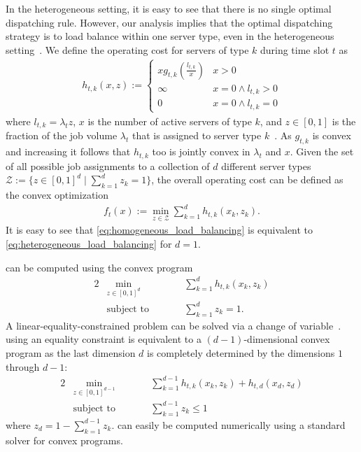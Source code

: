 In the heterogeneous setting, it is easy to see that there is no single optimal dispatching rule. However, our analysis implies that the optimal dispatching strategy is to load balance within one server type, even in the heterogeneous setting~\cite{Albers2021_2}. We define the operating cost for servers of type $k$ during time slot $t$ as \begin{align}\label{eq:heterogeneous_load_balancing_unit}
    h_{t,k}(x,z) := \begin{cases} 
        x g_{t,k}\left(\frac{l_{t,k}}{x}\right) & x > 0 \\
        \infty                                  & x = 0 \land l_{t,k} > 0 \\
        0                                       & x = 0 \land l_{t,k} = 0
    \end{cases}
\end{align} where $l_{t,k} = \lambda_t z$, $x$ is the number of active servers of type $k$, and $z \in [0,1]$ is the fraction of the job volume $\lambda_t$ that is assigned to server type $k$~\cite{Albers2021_2}. As $g_{t,k}$ is convex and increasing it follows that $h_{t,k}$ too is jointly convex in $\lambda_t$ and $x$. Given the set of all possible job assignments to a collection of $d$ different server types $\mathcal{Z} := \{z \in [0,1]^d \mid \sum_{k=1}^d z_k = 1\}$, the overall operating cost can be defined as the convex optimization \begin{align}\label{eq:heterogeneous_load_balancing}
    f_t(x) := \min_{z \in \mathcal{Z}} \sum_{k=1}^d h_{t,k}(x_k,z_k).
\end{align} It is easy to see that \cref{eq:homogeneous_load_balancing} is equivalent to \cref{eq:heterogeneous_load_balancing} for $d = 1$.

 can be computed using the convex program \begin{alignat}{2}\label{eq:heterogeneous_load_balancing_constrained_convex_program}
    &\min_{z \in [0,1]^d} &\qquad&\sum_{k=1}^d h_{t,k}(x_k,z_k) \\
    &\textrm{subject to}  &      &\sum_{k=1}^d z_k = 1.
\end{alignat} A linear-equality-constrained problem can be solved via a change of variable~\cite{Singer2016}.  using an equality constraint is equivalent to a $(d-1)$-dimensional convex program as the last dimension $d$ is completely determined by the dimensions $1$ through $d-1$: \begin{alignat}{2}\label{eq:heterogeneous_load_balancing_convex_program}
    &\min_{z \in [0,1]^{d-1}} &\qquad&\sum_{k=1}^{d-1} h_{t,k}(x_k,z_k) + h_{t,d}(x_d,z_d) \\
    &\textrm{subject to}  &      &\sum_{k=1}^{d-1} z_k \leq 1 \nonumber
\end{alignat} where $z_d = 1 - \sum_{k=1}^{d-1} z_k$.  can easily be computed numerically using a standard solver for convex programs.

